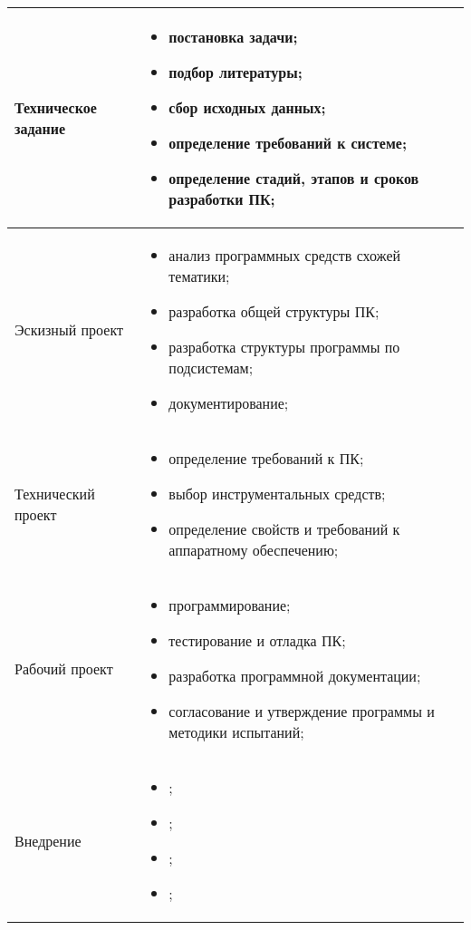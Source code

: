 \begin{center}
\begin{longtable}{|l|l|}
\hline
\endlastfoot
		Техническое задание & \begin{parbox}{5in} {
						\begin{itemize}
							\item постановка задачи;
							\item подбор литературы;
							\item сбор исходных данных;
							\item определение требований к системе;
							\item определение стадий, этапов и сроков разработки ПК;
						\end{itemize} }  
					\end{parbox} \\
	\hline
		Эскизный проект & \begin{parbox}{5in} {
					\begin{itemize} 
						\item анализ программных средств схожей тематики;
						\item разработка общей структуры ПК;
						\item разработка структуры программы по подсистемам;
						\item документирование;
					\end{itemize} }
				\end{parbox} \\
	\hline
		Технический проект & \begin{parbox}{5in} {
					\begin{itemize} 
						\item определение требований к ПК;
						\item выбор инструментальных средств;
						\item определение свойств и требований к аппаратному обеспечению;
					\end{itemize} } 
				\end{parbox} \\
		Рабочий проект & \begin{parbox}{5in} {
					\begin{itemize} 
						\item программирование;
						\item тестирование и отладка ПК;
						\item разработка программной документации;
						\item согласование и утверждение программы и методики испытаний;
					\end{itemize} }
				\end{parbox} \\
	\hline
		Внедрение & \begin{parbox}{5in} {
					\begin{itemize}
						\item ;
						\item ;
						\item ;
						\item ;
					\end{itemize} }
				\end{parbox} \\
\end{longtable}
\end{center}

\newpage
